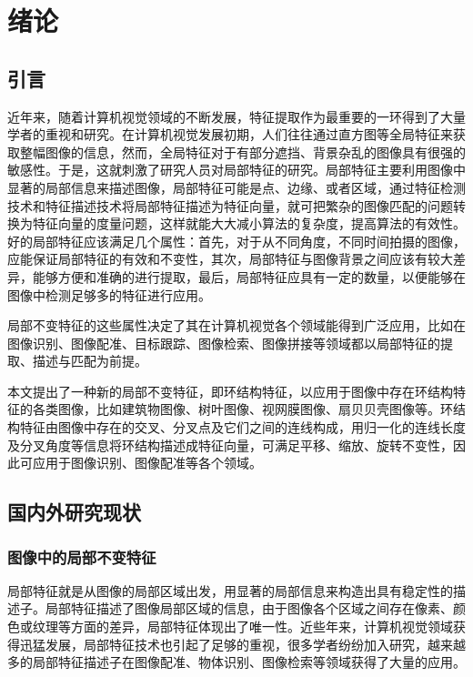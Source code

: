 

\chapter{绪论}
\label{cha:intro}


\section{引言}
\label{}

近年来，随着计算机视觉领域的不断发展，特征提取作为最重要的一环得到了大量学者的重视和研究\cite{shipeng}。在计算机视觉发展初期，人们往往通过直方图等全局特征来获取整幅图像的信息\cite{liuying}，然而，全局特征对于有部分遮挡、背景杂乱的图像具有很强的敏感性。于是，这就刺激了研究人员对局部特征的研究。局部特征主要利用图像中显著的局部信息来描述图像，局部特征可能是点、边缘、或者区域，通过特征检测技术和特征描述技术将局部特征描述为特征向量，就可把繁杂的图像匹配的问题转换为特征向量的度量问题，这样就能大大减小算法的复杂度，提高算法的有效性。好的局部特征应该满足几个属性：首先，对于从不同角度，不同时间拍摄的图像，应能保证局部特征的有效和不变性，其次，局部特征与图像背景之间应该有较大差异，能够方便和准确的进行提取，最后，局部特征应具有一定的数量，以便能够在图像中检测足够多的特征进行应用。

局部不变特征的这些属性决定了其在计算机视觉各个领域能得到广泛应用，比如在图像识别、图像配准、目标跟踪、图像检索、图像拼接等领域都以局部特征的提取、描述与匹配为前提。

本文提出了一种新的局部不变特征，即环结构特征，以应用于图像中存在环结构特征的各类图像，比如建筑物图像、树叶图像、视网膜图像、扇贝贝壳图像等。环结构特征由图像中存在的交叉、分叉点及它们之间的连线构成，用归一化的连线长度及分叉角度等信息将环结构描述成特征向量，可满足平移、缩放、旋转不变性，因此可应用于图像识别、图像配准等各个领域。


\section{国内外研究现状}
\label{} 



\subsection{图像中的局部不变特征}
\label{}

局部特征就是从图像的局部区域出发，用显著的局部信息来构造出具有稳定性的描述子。局部特征描述了图像局部区域的信息，由于图像各个区域之间存在像素、颜色或纹理等方面的差异，局部特征体现出了唯一性。近些年来，计算机视觉领域获得迅猛发展，局部特征技术也引起了足够的重视，很多学者纷纷加入研究，越来越多的局部特征描述子在图像配准、物体识别、图像检索等领域获得了大量的应用。

